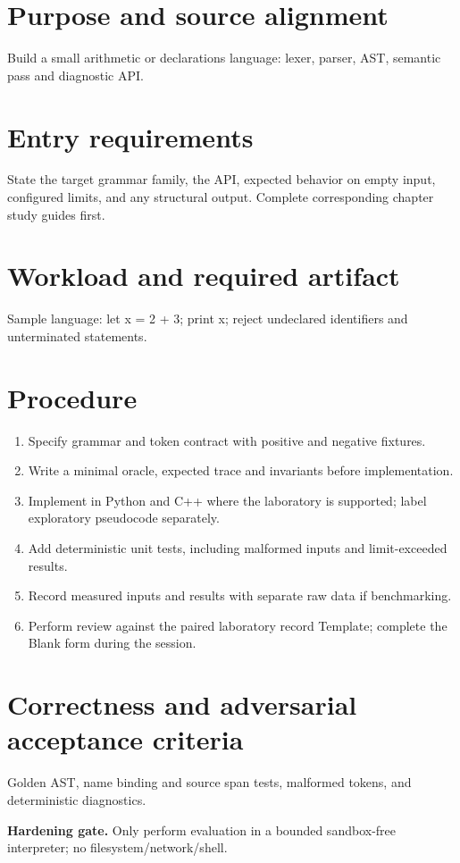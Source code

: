 \documentclass[11pt,letterpaper]{article}
\begin{document}
\makedoctitle\makedocsummary
\tableofcontents\clearpage
\section{Purpose and source alignment}
Build a small arithmetic or declarations language: lexer, parser, AST, semantic pass and diagnostic API.
\section{Entry requirements}
State the target grammar family, the API, expected behavior on empty input, configured limits, and any structural output. Complete corresponding chapter study guides first.
\section{Workload and required artifact}
Sample language: let x = 2 + 3; print x; reject undeclared identifiers and unterminated statements.
\section{Procedure}
\begin{enumerate}\item Specify grammar and token contract with positive and negative fixtures.\item Write a minimal oracle, expected trace and invariants before implementation.\item Implement in Python and C++ where the laboratory is supported; label exploratory pseudocode separately.\item Add deterministic unit tests, including malformed inputs and limit-exceeded results.\item Record measured inputs and results with separate raw data if benchmarking.\item Perform review against the paired laboratory record Template; complete the Blank form during the session.\end{enumerate}
\section{Correctness and adversarial acceptance criteria}
Golden AST, name binding and source span tests, malformed tokens, and deterministic diagnostics.\par\textbf{Hardening gate.} Only perform evaluation in a bounded sandbox-free interpreter; no filesystem/network/shell.
\end{document}
